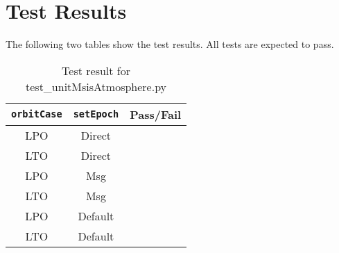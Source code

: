 \section{Test Results}
The following two tables show the test results.  All tests are expected to pass.


\begin{table}[H]
	\caption{Test result for test\_unitMsisAtmosphere.py}
	\label{tab:results}
	\centering \fontsize{10}{10}\selectfont
	\begin{tabular}{c  | c  | c} %
		\hline\hline
		{\tt orbitCase} & {\tt setEpoch} &  \textbf{Pass/Fail} \\ 
		\hline
		LPO & Direct &   \\ 
		LTO & Direct &   \\ 
		LPO & Msg &   \\ 
		LTO & Msg &   \\ 
		LPO & Default &   \\ 
		LTO & Default &   \\ 
		\hline
		\hline
	\end{tabular}
\end{table}


